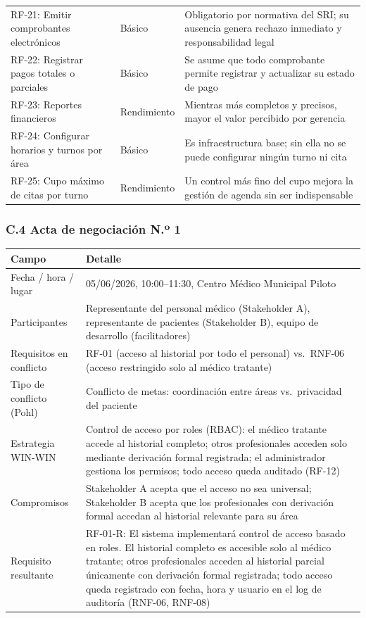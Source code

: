 \documentclass[11pt,a4paper]{article}
\begin{document}
\begin{longtable}{p{} p{} p{}}
		RF-21: Emitir comprobantes electrónicos & Básico & Obligatorio por normativa del SRI; su ausencia genera rechazo inmediato y responsabilidad legal \\
		RF-22: Registrar pagos totales o parciales & Básico & Se asume que todo comprobante permite registrar y actualizar su estado de pago \\
		RF-23: Reportes financieros & Rendimiento & Mientras más completos y precisos, mayor el valor percibido por gerencia \\
		RF-24: Configurar horarios y turnos por área & Básico & Es infraestructura base; sin ella no se puede configurar ningún turno ni cita \\
		RF-25: Cupo máximo de citas por turno & Rendimiento & Un control más fino del cupo mejora la gestión de agenda sin ser indispensable \\
	\end{longtable}
	
	\subsubsection{C.4 Acta de negociación N.º 1}
	
	\begin{longtable}{p{} p{} }
		
		
		\toprule
		\textbf{Campo} &
		\textbf{Detalle}  \\
		\midrule
		\endhead
		
		Fecha / hora / lugar & 05/06/2026, 10:00--11:30, Centro Médico Municipal Piloto \\
		Participantes & Representante del personal médico (Stakeholder A), representante de pacientes (Stakeholder B), equipo de desarrollo (facilitadores) \\
		Requisitos en conflicto & RF-01 (acceso al historial por todo el personal) vs.~RNF-06 (acceso restringido solo al médico tratante) \\
		Tipo de conflicto (Pohl) & Conflicto de metas: coordinación entre áreas vs.~privacidad del paciente \\
		Estrategia WIN-WIN & Control de acceso por roles (RBAC): el médico tratante accede al historial completo; otros profesionales acceden solo mediante derivación formal registrada; el administrador gestiona los permisos; todo acceso queda auditado (RF-12) \\
		Compromisos & Stakeholder A acepta que el acceso no sea universal; Stakeholder B acepta que los profesionales con derivación formal accedan al historial relevante para su área \\
		Requisito resultante & RF-01-R: El sistema implementará control de acceso basado en roles. El historial completo es accesible solo al médico tratante; otros profesionales acceden al historial parcial únicamente con derivación formal registrada; todo acceso queda registrado con fecha, hora y usuario en el log de auditoría (RNF-06, RNF-08) \\
		\bottomrule
	\end{longtable}
	
\end{document}
